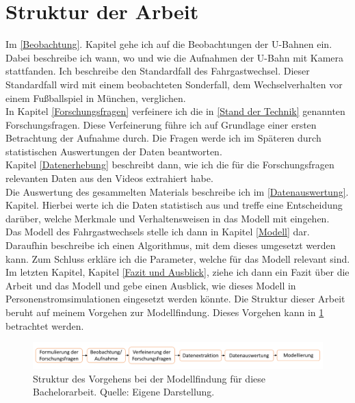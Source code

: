 \section{Struktur der Arbeit} \label{Struktur der Arbeit}
Im \ref{Beobachtung}. Kapitel gehe ich auf die Beobachtungen der U-Bahnen ein. Dabei beschreibe ich wann, wo und wie die Aufnahmen der U-Bahn mit Kamera stattfanden. Ich beschreibe den Standardfall des Fahrgastwechsel. Dieser Standardfall wird mit einem beobachteten Sonderfall, dem Wechselverhalten vor einem Fußballspiel in München, verglichen.\\
In Kapitel \ref{Forschungsfragen} verfeinere ich die in \ref{Stand der Technik} genannten Forschungsfragen. Diese Verfeinerung führe ich auf Grundlage einer ersten Betrachtung der Aufnahme durch. Die Fragen werde ich im Späteren durch statistischen Auswertungen der Daten beantworten.\\
Kapitel \ref{Datenerhebung} beschreibt dann, wie ich die für die Forschungsfragen relevanten Daten aus den Videos extrahiert habe.\\
Die Auswertung des gesammelten Materials beschreibe ich im \ref{Datenauswertung}. Kapitel. Hierbei werte ich die Daten statistisch aus und treffe eine Entscheidung darüber, welche Merkmale und Verhaltensweisen in das Modell mit eingehen.\\
Das Modell des Fahrgastwechsels stelle ich dann in Kapitel \ref{Modell} dar. Daraufhin beschreibe ich einen Algorithmus, mit dem dieses umgesetzt werden kann. Zum Schluss erkläre ich die Parameter, welche für das Modell relevant sind. \\
Im letzten Kapitel, Kapitel \ref{Fazit und Ausblick}, ziehe ich dann ein Fazit über die Arbeit und das Modell und gebe einen Ausblick, wie dieses Modell in Personenstromsimulationen eingesetzt werden könnte.
Die Struktur dieser Arbeit beruht auf meinem Vorgehen zur Modellfindung. Dieses Vorgehen kann in \figurename \ref{fig:Vorgehen} betrachtet werden.
\begin{figure}[H]
	\centering
		\includegraphics[width=1.0\textwidth]{pictures/introduction/strukture/strukture_work.png}
	\caption{Struktur des Vorgehens bei der Modellfindung für diese Bachelorarbeit. Quelle: Eigene Darstellung.}
	\label{fig:Vorgehen}
\end{figure}
 
